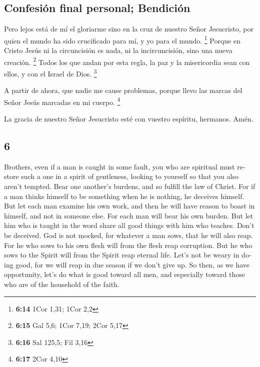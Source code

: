 \begin{paracol}{2}
\hypertarget{confesiuxf3n-final-personal-bendiciuxf3n}{%
\subsection{Confesión final personal;
Bendición}\label{confesiuxf3n-final-personal-bendiciuxf3n}}

 Pero lejos está de mí el gloriarme sino en la cruz de
nuestro Señor Jesucristo, por quien el mundo ha sido crucificado para
mí, y yo para el mundo. \footnote{\textbf{6:14} 1Cor 1,31; 1Cor 2,2}
 Porque en Cristo Jesús ni la circuncisión es nada, ni la
incircuncisión, sino una nueva creación. \footnote{\textbf{6:15} Gal
  5,6; 1Cor 7,19; 2Cor 5,17}  Todos los que andan por
esta regla, la paz y la misericordia sean con ellos, y con el Israel de
Dios. \footnote{\textbf{6:16} Sal 125,5; Fil 3,16}

 A partir de ahora, que nadie me cause problemas, porque
llevo las marcas del Señor Jesús marcadas en mi cuerpo. \footnote{\textbf{6:17}
  2Cor 4,10}

 La gracia de nuestro Señor Jesucristo esté con vuestro
espíritu, hermanos. Amén. \switchcolumn
\begin{otherlanguage}{english}

\hypertarget{section-11}{%
\section{6}\label{section-11}}

 Brothers, even if a man is caught in some fault, you who
are spiritual must restore such a one in a spirit of gentleness, looking
to yourself so that you also aren't tempted.  Bear one
another's burdens, and so fulfill the law of Christ.  For
if a man thinks himself to be something when he is nothing, he deceives
himself.  But let each man examine his own work, and then
he will have reason to boast in himself, and not in someone else.
 For each man will bear his own burden.  But
let him who is taught in the word share all good things with him who
teaches.  Don't be deceived. God is not mocked, for
whatever a man sows, that he will also reap.  For he who
sows to his own flesh will from the flesh reap corruption. But he who
sows to the Spirit will from the Spirit reap eternal life.
 Let's not be weary in doing good, for we will reap in due
season if we don't give up.  So then, as we have
opportunity, let's do what is good toward all men, and especially toward
those who are of the household of the faith.


\end{otherlanguage}
\end{paracol}
